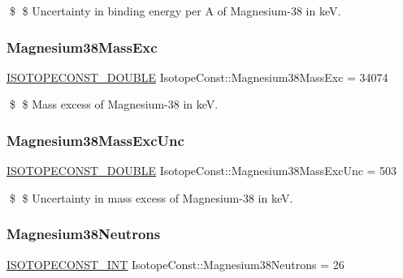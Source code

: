 \$ \$ Uncertainty in binding energy per A of Magnesium-\/38 in keV. \mbox{\label{group___isotope_const-_magnesium-_mg38_ga73232a6869e95bfcc333af6b52d0e2d0}} 
\subsubsection{\texorpdfstring{Magnesium38\+Mass\+Exc}{Magnesium38MassExc}}
{\footnotesize\ttfamily \mbox{\hyperlink{group___isotope_const-_macros_ga8f45a7272ce02c0b4c65c44636ed719a}{I\+S\+O\+T\+O\+P\+E\+C\+O\+N\+S\+T\+\_\+\+D\+O\+U\+B\+LE}} Isotope\+Const\+::\+Magnesium38\+Mass\+Exc = 34074}

\$ \$ Mass excess of Magnesium-\/38 in keV. \mbox{\label{group___isotope_const-_magnesium-_mg38_gaa230d01c89681084a867902079e8d438}} 
\subsubsection{\texorpdfstring{Magnesium38\+Mass\+Exc\+Unc}{Magnesium38MassExcUnc}}
{\footnotesize\ttfamily \mbox{\hyperlink{group___isotope_const-_macros_ga8f45a7272ce02c0b4c65c44636ed719a}{I\+S\+O\+T\+O\+P\+E\+C\+O\+N\+S\+T\+\_\+\+D\+O\+U\+B\+LE}} Isotope\+Const\+::\+Magnesium38\+Mass\+Exc\+Unc = 503}

\$ \$ Uncertainty in mass excess of Magnesium-\/38 in keV. \mbox{\label{group___isotope_const-_magnesium-_mg38_ga5b9de8afa4985287854c85667c574f75}} 
\subsubsection{\texorpdfstring{Magnesium38\+Neutrons}{Magnesium38Neutrons}}
{\footnotesize\ttfamily \mbox{\hyperlink{group___isotope_const-_macros_ga5f18360b3e99483a35c32d789e62621c}{I\+S\+O\+T\+O\+P\+E\+C\+O\+N\+S\+T\+\_\+\+I\+NT}} Isotope\+Const\+::\+Magnesium38\+Neutrons = 26}

